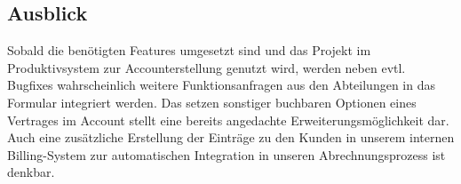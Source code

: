\subsection{Ausblick}
\label{sec:Ausblick}

Sobald die benötigten Features umgesetzt sind und das Projekt im Produktivsystem zur Accounterstellung genutzt wird, werden neben evtl. Bugfixes wahrscheinlich weitere Funktionsanfragen aus den Abteilungen in das Formular integriert werden. Das setzen sonstiger buchbaren Optionen eines Vertrages im Account stellt eine bereits angedachte Erweiterungsmöglichkeit dar. Auch eine zusätzliche Erstellung der Einträge zu den Kunden in unserem internen Billing-System zur automatischen Integration in unseren Abrechnungsprozess ist denkbar.

